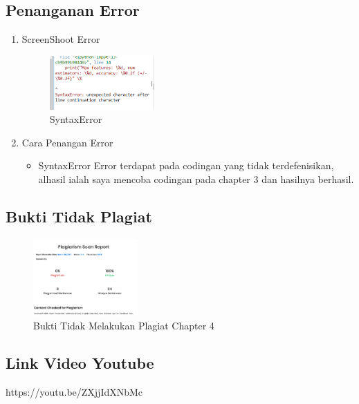 \subsection{Penanganan Error}
\begin{enumerate}
	\item ScreenShoot Error
	\begin{figure}[H]
		\includegraphics[width=4cm]{figures/1174080/4/error.PNG}
		\centering
		\caption{SyntaxError}
	\end{figure}
	\item Cara Penangan Error
	\begin{itemize}
		\item SyntaxError
		\hfill\break
		Error terdapat pada codingan yang tidak terdefenisikan, alhasil ialah saya mencoba codingan pada chapter 3 dan hasilnya berhasil.
	\end{itemize}
\end{enumerate}

\subsection{Bukti Tidak Plagiat}
\begin{figure}[H]
\centering
	\includegraphics[width=4cm]{figures/1174080/4/plagiat.PNG}
	\caption{Bukti Tidak Melakukan Plagiat Chapter 4}
\end{figure}

\subsection{Link Video Youtube}
https://youtu.be/ZXjjIdXNbMc
